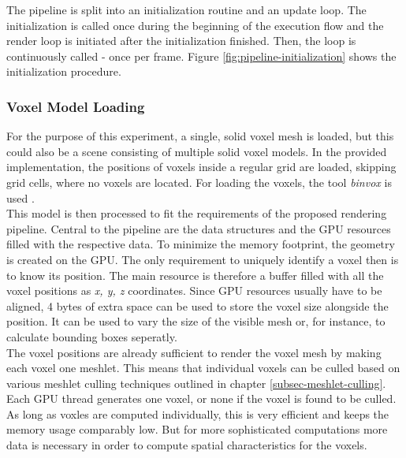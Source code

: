 \noindent
The pipeline is split into an initialization routine and an update loop. The initialization is called once during 
the beginning of the execution flow and the render loop is initiated after the initialization finished. Then, the 
loop is continuously called - once per frame. Figure \ref{fig:pipeline-initialization} shows the initialization 
procedure. 

\subsubsection*{Voxel Model Loading} \label{subsec-voxel-model-loading}

For the purpose of this experiment, a single, solid voxel mesh is loaded, but this could also be a scene 
consisting of multiple solid voxel models. In the provided implementation, the positions of voxels inside a regular 
grid are loaded, skipping grid cells, where no voxels are located. For loading the voxels, the tool \emph{binvox} 
is used \cite{binvox, Nooruddin2003}. \\

\noindent
This model is then processed to fit the requirements of the proposed rendering pipeline. Central to the pipeline 
are the data structures and the \ac{GPU} resources filled with the respective data. To minimize the memory footprint,
the geometry is created on the \ac{GPU}. The only requirement to uniquely identify a voxel then is to know its position.
The main resource is therefore a buffer filled with all the voxel positions as \emph{x, y, z} coordinates. Since \ac{GPU} 
resources usually have to be aligned, 4 bytes of extra space can be used to store the voxel size alongside the position.
It can be used to vary the size of the visible mesh or, for instance, to calculate bounding boxes seperatly. \\

The voxel positions are already sufficient to render the voxel mesh by making each voxel one meshlet. This means that 
individual voxels can be culled based on various meshlet culling techniques outlined in chapter 
\ref{subsec-meshlet-culling}. Each \ac{GPU} thread generates one voxel, or none if the voxel is found to be culled. 
As long as voxles are computed individually, this is very efficient and keeps the memory usage comparably low. But for 
more sophisticated computations more data is necessary in order to compute spatial characteristics for the voxels. \\

